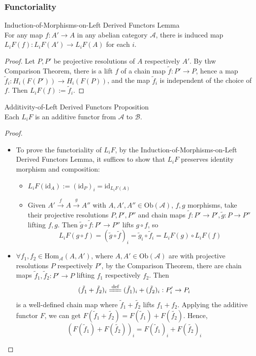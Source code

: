 \subsubsection{Functoriality}
\begin{lemma}{Induction-of-Morphisms-on-Left Derived Functors Lemma}\\
For any map $f: A'\to A$ in any abelian category $\mathcal{A}$, there is induced map $L_iF(f): L_iF(A') \to L_iF(A)$ for each $i$.
\end{lemma}

\begin{proof}
    Let $P,P'$ be projective resolutions of $A$ respectively $A'$. By thw Comparison Theorem, there is a lift $f$ of a chain map $\tilde{f}:P'\to P$, hence a map $\tilde{f}_i :H_i(F(P')) \to H_i (F(P))$, and the map $\tilde{f}_i$ is independent of the choice of $f$. Then $L_iF(f):= \tilde{f}_i$.
\end{proof}

\begin{proposition}{Additivity-of-Left Derived Functors Proposition}\\
Each $L_iF$ is an additive functor from $\mathcal{A}$ to $\mathcal{B}$.
\end{proposition}

\begin{proof}
    \begin{itemize}
        \item To prove the functoriality of $L_iF$, by the Induction-of-Morphisms-on-Left Derived Functors Lemma, it suffices to show that $L_iF$ preserves identity morphism and composition:
        \begin{itemize}
            \item $L_iF(\text{id}_A) := (\text{id}_P)_i = \text{id}_{L_iF(A)}$
            \item Given $A'\xrightarrow{f} A\xrightarrow{g} A''$ with $A,A',A'' \in \text{Ob} (\mathcal{A})$, $f,g$ morphisms, take their projective resolutions $P,P',P''$ and chain maps $\tilde{f}:P'\to P', \tilde{g}:P \to P''$ lifting $f,g$. Then $\tilde{g} \circ \tilde{f}: P'\to P''$ lifts $g\circ f$, so
            \[
            L_iF(g \circ f)= (\tilde{g} \circ \tilde{f})_i= \tilde{g}_i \circ \tilde{f}_i= L_iF(g) \circ L_iF(f)
            \]
        \end{itemize}

        \item $\forall f_1,f_2 \in \text{Hom}_\mathcal{
        A
        }(A,A')$, where $A,A' \in \text{Ob} (\mathcal{A})$ are with projective resolutions $P$ respectively $P'$, by the Comparison Theorem, there are chain maps $\tilde{f}_1, \tilde{f}_2: P'\to P$ lifting $f_1$ respectively $f_2$. Then
        \[
        (\tilde{f}_1+ \tilde{f_2})_i \xlongequal{\text{def}} (\tilde{f}_1)_i +(\tilde{f}_2) _i:P_i' \to P_i
        \]
        is a well-defined chain map where $\tilde{f}_1+ \tilde{f_2}$ lifts $f_1+f_2$. Applying the additive functor $F$, we can get $F(\tilde{f}_1+ \tilde{f_2})= F(\tilde{f}_1)+ F(\tilde{f_2})$. Hence,
        \[
        (F(\tilde{f}_1)+ F(\tilde{f_2}))_i= F(\tilde{f}_1)_i+ F(\tilde{f_2})_i
        \]
    \end{itemize}
\end{proof}

